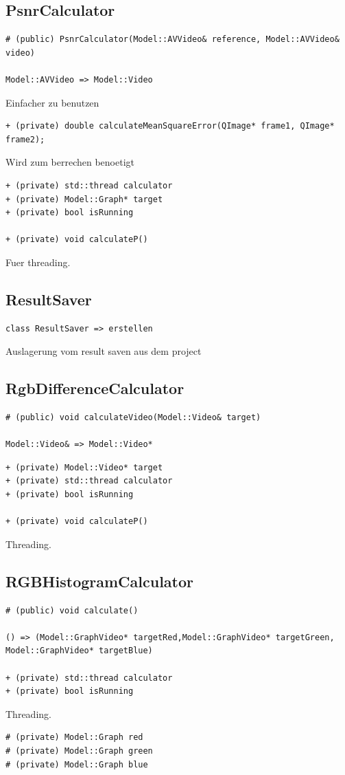 \documentclass{scrartcl}
\begin{document}
{\subsection{PsnrCalculator}
\begin{verbatim}
# (public) PsnrCalculator(Model::AVVideo& reference, Model::AVVideo& video)

Model::AVVideo => Model::Video
\end{verbatim}
Einfacher zu benutzen
\begin{verbatim}
+ (private) double calculateMeanSquareError(QImage* frame1, QImage* frame2);
\end{verbatim}
Wird zum berrechen benoetigt
\begin{verbatim}
+ (private) std::thread calculator
+ (private) Model::Graph* target
+ (private) bool isRunning

+ (private) void calculateP()
\end{verbatim}
Fuer threading.
\subsection{ResultSaver}
\begin{verbatim}
class ResultSaver => erstellen
\end{verbatim}
Auslagerung vom result saven aus dem project
\subsection{RgbDifferenceCalculator}
\begin{verbatim}
# (public) void calculateVideo(Model::Video& target)

Model::Video& => Model::Video*
\end{verbatim}
\begin{verbatim}
+ (private) Model::Video* target
+ (private) std::thread calculator
+ (private) bool isRunning

+ (private) void calculateP()
\end{verbatim}
Threading.
\subsection{RGBHistogramCalculator}
\begin{verbatim}
# (public) void calculate()

() => (Model::GraphVideo* targetRed,Model::GraphVideo* targetGreen, Model::GraphVideo* targetBlue)

+ (private) std::thread calculator
+ (private) bool isRunning
\end{verbatim}
Threading.
\begin{verbatim}
# (private) Model::Graph red
# (private) Model::Graph green
# (private) Model::Graph blue


\end{verbatim}}
\end{document}
